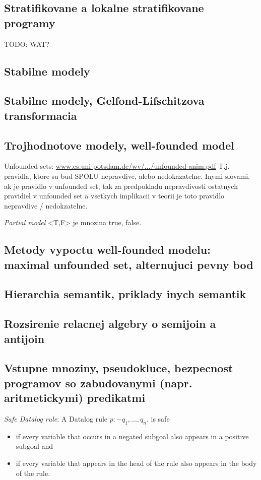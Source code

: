 \documentclass[12pt,a4paper]{article}
\begin{document}
\subsection{Stratifikovane a lokalne stratifikovane programy}
TODO: WAT? 

\subsection{Stabilne modely}

\subsection{Stabilne modely, Gelfond-Lifschitzova transformacia}

\subsection{Trojhodnotove modely, well-founded model}
Unfounded sets: \url{www.cs.uni-potsdam.de/wv/.../unfounded-anim.pdf} 
T.j. pravidla, ktore su bud SPOLU nepravdive, alebo nedokazatelne. Inymi slovami, ak je pravidlo v unfounded set, tak za predpokladu nepravdivosti ostatnych pravidiel v unfounded set a vsetkych implikacii v teorii je toto pravidlo nepravdive / nedokzatelne. 

\emph{Partial model} <T,F> je mnozina true, false. 

\subsection{Metody vypoctu well-founded modelu: maximal unfounded set, alternujuci pevny bod}

\subsection{Hierarchia semantik, priklady inych semantik}

\subsection{Rozsirenie relacnej algebry o semijoin a antijoin}

\subsection{Vstupne mnoziny, pseudokluce, bezpecnost programov so zabudovanymi (napr. aritmetickymi) predikatmi}
 
\emph{Safe Datalog rule}: A Datalog rule $p :- q_1, ..., q_n.$ is safe
\begin{itemize} 
\item if every variable that occurs in a negated subgoal also
appears in a positive subgoal and
\item if every variable that appears in the head of the rule also
appears in the body of the rule.
\end{itemize} 
\end{document}
